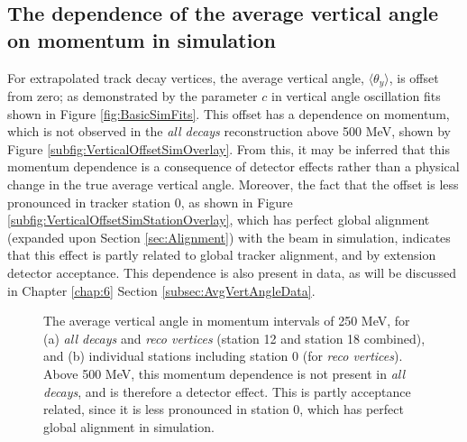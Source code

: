 \subsection{The dependence of the average vertical angle on momentum in simulation}\label{sec:AvgVertAngleSim}

For extrapolated track decay vertices, the average vertical angle, $\langle \theta_{y} \rangle$, is offset from zero; as demonstrated by the  parameter $c$ in vertical angle oscillation fits shown in Figure \ref{fig:BasicSimFits}. This offset has a dependence on momentum, which is not observed in the \textit{all decays} reconstruction above 500 MeV, shown by Figure \ref{subfig:VerticalOffsetSimOverlay}. From this, it may be inferred that this momentum dependence is a consequence of detector effects rather than a physical change in the true average vertical angle. Moreover, the fact that the offset is less pronounced in tracker station 0, as shown in Figure \ref{subfig:VerticalOffsetSimStationOverlay}, which has perfect global alignment (expanded upon Section \ref{sec:Alignment}) with the beam in simulation, indicates that this effect is partly related to global tracker alignment, and by extension detector acceptance. This dependence is also present in data, as will be discussed in Chapter \ref{chap:6} Section \ref{subsec:AvgVertAngleData}.

\begin{figure}[b!]
\centering{}
\caption{The average vertical angle in momentum intervals of 250 MeV, for (a) \textit{all decays} and \textit{reco vertices} (station 12 and station 18 combined), and (b) individual stations including station 0 (for \textit{reco vertices}). Above 500 MeV, this momentum dependence is not present in \textit{all decays}, and is therefore a detector effect. This is partly acceptance related, since it is less pronounced in station 0, which has perfect global alignment in simulation.} 
\label{fig:VerticalOffsetSim}
\end{figure} 

